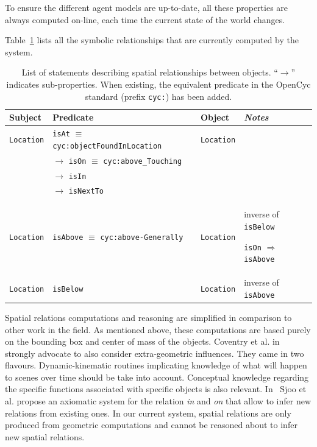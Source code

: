 \documentclass{svmult}
\newcommand{\concept}[1]{{\footnotesize \texttt{#1}}}
\begin{document}
To ensure the different agent models are up-to-date, all these properties are
always computed on-line, each time the current state of the world changes.

Table~\ref{facts|sprelations} lists all the symbolic relationships that are
currently computed by the system.

\begin{table}[h]
    \centering
    \begin{tabular}{p{1.5cm}p{5cm}p{2cm}p{2.7cm}}
	\rowcolor{white}
    \textbf{Subject} & \textbf{Predicate} & \textbf{Object} & \emph{Notes} \\ 
    \hline
	 \concept{Location} & \concept{isAt} $\equiv$ \concept{cyc:objectFoundInLocation}  &  \concept{Location} & \\ 
	 &  $\rightarrow$ \concept{isOn} $\equiv$ \concept{cyc:above\_Touching}  &  & \\ 
	 &  $\rightarrow$ \concept{isIn}  &  & \\ 
	 &  $\rightarrow$ \concept{isNextTo}  & &  \\ 
	 \concept{Location}  & \concept{isAbove} $\equiv$ \concept{cyc:above-Generally}  &  \concept{Location}  &  inverse of \concept{isBelow} \par \concept{isOn} $\Rightarrow$ \concept{isAbove}\\ 
	 \concept{Location}  & \concept{isBelow}  & \concept{Location}  &  inverse of \concept{isAbove}
	\end{tabular}

	\caption{List of statements describing spatial relationships between
	objects. ``$\rightarrow$'' indicates sub-properties. When existing, the
	equivalent predicate in the {\sc OpenCyc} standard (prefix \concept{cyc:})
	has been added.}

\label{facts|sprelations}
\end{table}

Spatial relations computations and reasoning are simplified in comparison to
other work in the field. As mentioned above, these computations are based
purely on the bounding box and center of mass of the objects. Coventry et al. in
~\cite{Coventry2005} strongly advocate to also consider extra-geometric
influences. They came in two flavours. Dynamic-kinematic routines implicating
knowledge of what will happen to scenes over time should be take into account.
Conceptual knowledge regarding the specific functions associated with specific
objects is also relevant. In~\cite{SjooIcar2011} Sjoo et al. propose an
axiomatic system for the relation \emph{in} and \emph{on} that allow to infer
new relations from existing ones. In our current system, spatial relations are
only produced from geometric computations and cannot be reasoned about to infer
new spatial relations.
\end{document}
